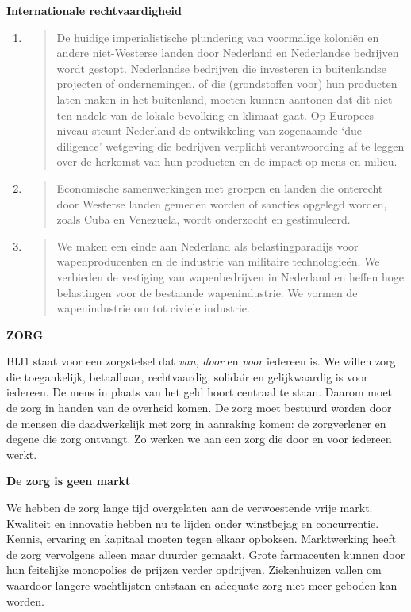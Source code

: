 \textbf{Internationale rechtvaardigheid}

\begin{enumerate}
\def\labelenumi{\arabic{enumi}.}
\item
  \begin{quote}
  De huidige imperialistische plundering van voormalige koloniën en
  andere niet-Westerse landen door Nederland en Nederlandse bedrijven
  wordt gestopt. Nederlandse bedrijven die investeren in buitenlandse
  projecten of ondernemingen, of die (grondstoffen voor) hun producten
  laten maken in het buitenland, moeten kunnen aantonen dat dit niet ten
  nadele van de lokale bevolking en klimaat gaat. Op Europees niveau
  steunt Nederland de ontwikkeling van zogenaamde `due diligence'
  wetgeving die bedrijven verplicht verantwoording af te leggen over de
  herkomst van hun producten en de impact op mens en milieu.
  \end{quote}
\item
  \begin{quote}
  Economische samenwerkingen met groepen en landen die onterecht door
  Westerse landen gemeden worden of sancties opgelegd worden, zoals Cuba
  en Venezuela, wordt onderzocht en gestimuleerd.
  \end{quote}
\item
  \begin{quote}
  We maken een einde aan Nederland als belastingparadijs voor
  wapenproducenten en de industrie van militaire technologieën. We
  verbieden de vestiging van wapenbedrijven in Nederland en heffen hoge
  belastingen voor de bestaande wapenindustrie. We vormen de
  wapenindustrie om tot civiele industrie.
  \end{quote}
\end{enumerate}

\textbf{ZORG}

BIJ1 staat voor een zorgstelsel dat \emph{van}, \emph{door} en
\emph{voor} iedereen is. We willen zorg die toegankelijk, betaalbaar,
rechtvaardig, solidair en gelijkwaardig is voor iedereen. De mens in
plaats van het geld hoort centraal te staan. Daarom moet de zorg in
handen van de overheid komen. De zorg moet bestuurd worden door de
mensen die daadwerkelijk met zorg in aanraking komen: de zorgverlener en
degene die zorg ontvangt. Zo werken we aan een zorg die door en voor
iedereen werkt.

\textbf{De zorg is geen markt}

We hebben de zorg lange tijd overgelaten aan de verwoestende vrije
markt. Kwaliteit en innovatie hebben nu te lijden onder winstbejag en
concurrentie. Kennis, ervaring en kapitaal moeten tegen elkaar opboksen.
Marktwerking heeft de zorg vervolgens alleen maar duurder gemaakt. Grote
farmaceuten kunnen door hun feitelijke monopolies de prijzen verder
opdrijven. Ziekenhuizen vallen om waardoor langere wachtlijsten ontstaan
en adequate zorg niet meer geboden kan worden.

